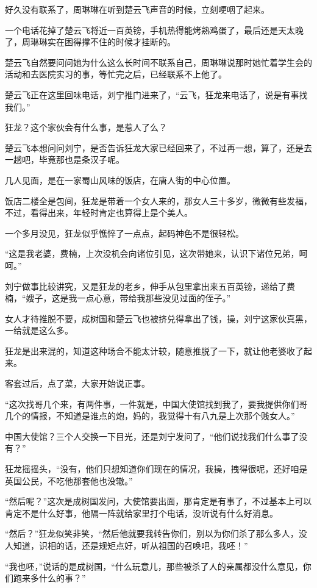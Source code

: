 好久没有联系了，周琳琳在听到楚云飞声音的时候，立刻哽咽了起来。

一个电话花掉了楚云飞将近一百英镑，手机热得能烤熟鸡蛋了，最后还是天太晚了，周琳琳实在困得撑不住的时候才挂断的。

楚云飞自然要问问她为什么这么长时间不联系自己，周琳琳说那时她忙着学生会的活动和去医院实习的事，等忙完之后，已经联系不上他了。

楚云飞正在这里回味电话，刘宁推门进来了，“云飞，狂龙来电话了，说是有事找我们。”

狂龙？这个家伙会有什么事，是惹人了么？

楚云飞本想问问刘宁，是否告诉狂龙大家已经回来了，不过再一想，算了，还是去一趟吧，毕竟那也是条汉子呢。

几人见面，是在一家蜀山风味的饭店，在唐人街的中心位置。

饭店二楼全是包间，狂龙是带着一个女人来的，那女人三十多岁，微微有些发福，不过，看得出来，年轻时肯定也算得上是个美人。

一个多月没见，狂龙似乎憔悴了一点点，起码神色不是很轻松。

“这是我老婆，费楠，上次没机会向诸位引见，这次带她来，认识下诸位兄弟，呵呵。”

刘宁做事比较讲究，又是狂龙的老乡，伸手从包里拿出来五百英镑，递给了费楠，“嫂子，这是我一点心意，带给我那些没见过面的侄子。”

女人才待推脱不要，成树国和楚云飞也被挤兑得拿出了钱，操，刘宁这家伙真黑，一给就是这么多。

狂龙是出来混的，知道这种场合不能太计较，随意推脱了一下，就让他老婆收了起来。

客套过后，点了菜，大家开始说正事。

“这次找哥几个来，有两件事，一件就是，中国大使馆找到我了，要我提供你们哥几个的情报，不知道是谁点的炮，妈的，我觉得十有八九是上次那个贱女人。”

中国大使馆？三个人交换一下目光，还是刘宁发问了，“他们说找我们什么事了没有？”

狂龙摇摇头，“没有，他们只想知道你们现在的情况，我操，拽得很呢，还好咱是英国公民，不吃他那套他也没辙。”

“然后呢？”这次是成树国发问，大使馆要出面，那肯定是有事了，不过基本上可以肯定不是什么好事，他隔一阵就给家里打个电话，没听说有什么好消息。

“然后？”狂龙似笑非笑，“然后他就要我转告你们，别以为你们杀了那么多人，没人知道，识相的话，还是规矩点好，听从祖国的召唤吧，我呸！”

“我也呸，”说话的是成树国，“什么玩意儿，那些被杀了人的亲属都没什么意见，你们跑来多什么的事？”

